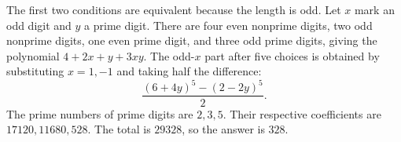 The first two conditions are equivalent because the length is odd. Let $x$ mark an odd digit and $y$ a prime digit. There are four even nonprime digits, two odd nonprime digits, one even prime digit, and three odd prime digits, giving the polynomial $4+2x+y+3xy$. The odd-$x$ part after five choices is obtained by substituting $x=1,-1$ and taking half the difference:
\[
\dfrac{(6+4y)^5-(2-2y)^5}{2}.
\]
The prime numbers of prime digits are $2,3,5$. Their respective coefficients are $17120,11680,528$. The total is $29328$, so the answer is $\boxed{328}$.
